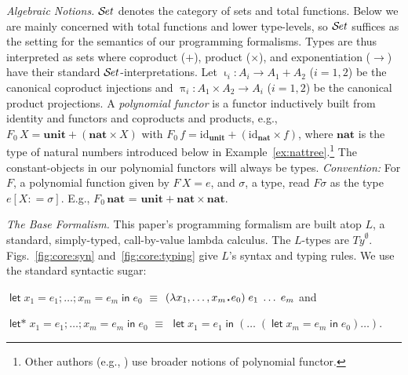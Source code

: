 \documentclass[envcountsame]{llncs}
\newcommand{\key}[1]{\ensuremath{\mathop{\mathsf{#1}}\nolimits}\xspace}
\newcommand{\In}{\key{in}}
\newcommand{\Let}{\key{let}}
\newcommand{\Letstar}{\key{let*}}
\newcommand{\type}[1]{\ensuremath{\mathbf{#1}}\xspace}
\newcommand{\Nat}{\type{nat}}
\newcommand{\Unit}{\ensuremath{\mathbf{unit}}\xspace}
\newcommand{\Ty}{\mathit{Ty}}
\newcommand{\id}{\mathrm{id}}
\newcommand{\SetCat}{\ensuremath{\mathcal{S}\mkern-2.5mu\mathit{et}}\xspace}
\newcommand{\inj}{\mathop{\iota}\nolimits}
\newcommand{\proj}{\mathop{\pi}\nolimits}
\renewcommand{\gets}{\ensuremath{\mathrel{\colon=}}\xspace}
\newcommand{\sqdot}{\rule{0.5mm}{0.5mm}}
\newcommand{\lam}[1]{\lambda #1\,\sqdot\,}
\newcommand{\of}{\colon}
\renewcommand{\colon}{\mathpunct{:}}
\begin{document}
\emph{Algebraic Notions.} 
$\SetCat$ denotes the category of sets and total functions.  
Below we are mainly concerned with total functions and lower
type-levels, so $\SetCat$ suffices as the setting for the semantics of 
our programming formalisms.
Types are thus interpreted as sets where
coproduct ($+$), product ($\times$), and exponentiation ($\to$) have
their standard $\SetCat$-interpretations.  Let $\inj_i\of
A_i\to A_1+A_2$ ($i=1,2$) be the canonical coproduct injections and
$\proj_i\of A_1\times A_2 \to A_i$ ($i=1,2$) be the canonical
product projections.
A \emph{polynomial functor} is a functor inductively built from 
identity and functors and coproducts and products,
e.g.,
$F_{0}\, X = \Unit + (\Nat \times X)$ with 
$F_0\, f = \id_{\Unit} + (\id_{\Nat}\times f)$, where 
$\Nat$ is the type of natural numbers introduced below in 
Example~\ref{ex:nattree}.\footnote{Other authors (e.g., \cite{rutten:coalg}) use broader 
  notions of polynomial functor.} 
The constant-objects in our polynomial functors will always be
types.  \emph{Convention:} For $F$, a polynomial function given by
$F\,X = e$, and $\sigma$, a type, read $F \sigma$ as
the type $e[X\gets \sigma]$.
E.g., $F_0\,\Nat$ = $\Unit + \Nat \times \Nat$.


\emph{The Base Formalism.}
This paper's programming formalism are built atop $L$, a standard,
simply-typed, call-by-value lambda calculus.  The $L$-types are
$\Ty^{\emptyset}$.  Figs.~\ref{fig:core:syn}
and~\ref{fig:core:typing} give $L$'s syntax and typing rules.  We
use the standard syntactic sugar:
\begin{inparaenum}[\it (i)]
\item 
  $\Let x_1=e_1;\dots; x_m=e_m \In e_0$ 
  $\equiv$
  $(\lam{x_1,\dots,x_m}e_0)\;e_1\;\dots\;e_m$ and 
\item 
  $\Letstar x_{1}=e_{1}; \dots; \allowbreak 
  x_{m}= e_{m} \In e_{0}$
  $\equiv$
  $\Let x_1=e_1\In\allowbreak 
  (\dots \; (\Let x_m=e_m\In e_0)\dots)$.
\end{inparaenum}
\end{document}

